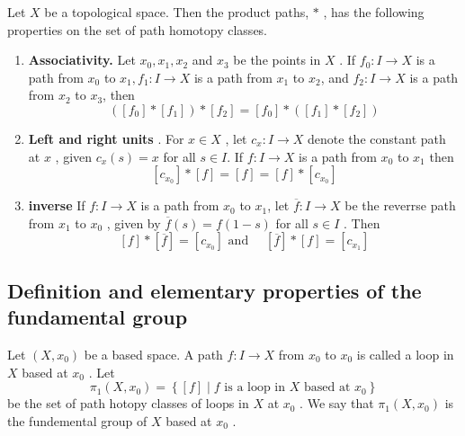\documentclass{article}
\theoremstyle{remark}
\begin{document}
\begin{theorem}
    Let $X$   be a topological space. Then the product paths, $*$  , has the following properties on the set of path
    homotopy classes.

    \begin{enumerate}[label=(\roman*)]
        \item \textbf{Associativity.} Let $x_{0}, x_{1}, x_{2}$   and $x_{3}$  be the points in $X$  . If $f_{0}: I \to X$
             is a path from $x_{0}$  to $x_{1}, f_{1}: I\to X$  is a path from $x_{1}$  to $x_{2}$, and $f_{2}: I \to X$  is
            a path from $x_{2}$  to $x_{3}$, then \[
            \left( \left[ f_{0} \right] * \left[ f_{1} \right] \right) * \left[ f_{2} \right] = \left[ f_{0} \right] *
            \left( \left[ f_{1} \right] * \left[ f_{2} \right] \right)
            \]
        \item \textbf{Left and right units} . For $x \in X$ , let $c_{x}: I\to X$ denote the constant path at $x$ ,
            given $c_{x}\left( s \right) = x$ for all $s \in  I$. If $f: I \to X$ is a path from $x_{0}$ to $x_{1}$
            then \[
            \left[ c_{x_{0}} \right] * \left[ f \right] = \left[ f \right] = \left[ f \right] * \left[ c_{x_{0}} \right]
            \]
        \item \textbf{inverse} If $f: I\to X$  is a path from $x_{0}$ to $x_{1}$, let $\overline{f} : I \to X$ be the
            reverrse path from $x_{1}$  to $x_{0}$ , given by $\overline{f} \left( s \right) = f\left( 1-s \right)$  for
            all $s \in I$ . Then \[
            \left[ f \right] * \left[ \overline{f}  \right] = \left[ c_{x_{0}} \right] \text{ and } \quad \left[
            \overline{f}  \right] * \left[ f \right] = \left[ c_{x_{1}} \right]
            \]
    \end{enumerate}

\end{theorem}
\subsection{Definition and elementary properties of the fundamental group}%
\label{sub:definition_and_elementary_properties_of_the_fundamental_group}

\begin{definition}
    Let $\left( X, x_{0} \right)$ be a based space. A path $f: I \to X$  from $x_{0}$  to $x_{0}$ is called a loop in
    $X$  based at $x_{0}$ . Let \[
        \pi _{1}\left( X, x_{0} \right) = \left\{ \left[ f \right]  \mid  f \text{ is a loop in } X \text{ based at
        }x_{0}  \right\}
    \]
    be the set of path hotopy classes of loops in $X$ at $x_{0}$ . We say that $\pi _{1} \left( X,x_{0} \right)$ is the
    fundemental group of $X$  based at $x_{0}$ .
\end{definition}
\end{document}
